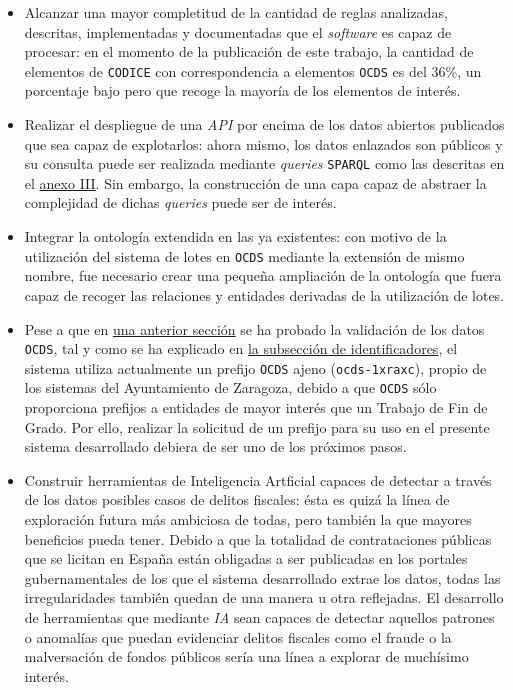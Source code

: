     \begin{itemize}
        \item Alcanzar una mayor completitud de la cantidad de reglas analizadas, descritas, implementadas y documentadas que el \textit{software} es capaz de procesar: en el momento de la publicación de este trabajo, la cantidad de elementos de \texttt{CODICE} con correspondencia a elementos \texttt{OCDS} es del 36\%, un porcentaje bajo pero que recoge la mayoría de los elementos de interés.
        \\
        \item Realizar el despliegue de una \textit{API} por encima de los datos abiertos publicados que sea capaz de explotarlos: ahora mismo, los datos enlazados son públicos y su consulta puede ser realizada mediante \textit{queries} \texttt{SPARQL} como las descritas en el \hyperref[annex:sparql]{anexo III}. Sin embargo, la construcción de una capa capaz de abstraer la complejidad de dichas \textit{queries} puede ser de interés.
        \\
        \item Integrar la ontología extendida en las ya existentes: con motivo de la utilización del sistema de lotes en \texttt{OCDS} mediante la extensión de mismo nombre, fue necesario crear una pequeña ampliación de la ontología \cite{MYONT} que fuera capaz de recoger las relaciones y entidades derivadas de la utilización de lotes.
        \\
        \item Pese a que en \hyperref[subsec:validacion]{una anterior sección} se ha probado la validación de los datos \texttt{OCDS}, tal y como se ha explicado en \hyperref[subsubsec:expediente]{la subsección de identificadores}, el sistema utiliza actualmente un prefijo \texttt{OCDS} ajeno (\texttt{ocds-1xraxc}), propio de los sistemas del Ayuntamiento de Zaragoza, debido a que \texttt{OCDS} sólo proporciona prefijos a entidades de mayor interés que un Trabajo de Fin de Grado. Por ello, realizar la solicitud de un prefijo para su uso en el presente sistema desarrollado debiera de ser uno de los próximos pasos.
        \\
        \item Construir herramientas de Inteligencia Artficial capaces de detectar a través de los datos posibles casos de delitos fiscales: ésta es quizá la línea de exploración futura más ambiciosa de todas, pero también la que mayores beneficios pueda tener. Debido a que la totalidad de contrataciones públicas que se licitan en España están obligadas a ser publicadas en los portales gubernamentales de los que el sistema desarrollado extrae los datos, todas las irregularidades también quedan de una manera u otra reflejadas. El desarrollo de herramientas que mediante \textit{IA} sean capaces de detectar aquellos patrones o anomalías que puedan evidenciar delitos fiscales como el fraude o la malversación de fondos públicos sería una línea a explorar de muchísimo interés.
    \end{itemize}
\newpage